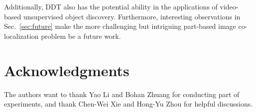 \documentclass[twocolumn]{svjour3}          \smartqed  \usepackage{graphicx}
\begin{document}
Additionally, DDT also has the potential ability in the applications of video-based unsupervised object discovery. Furthermore, interesting observations in Sec.~\ref{sec:future} make the more challenging but intriguing part-based image co-localization problem be a future work.

\section*{Acknowledgments}
The authors want to thank Yao Li and Bohan Zhuang for conducting part of experiments, and thank Chen-Wei Xie and Hong-Yu Zhou for helpful discussions.


      
\end{document}
